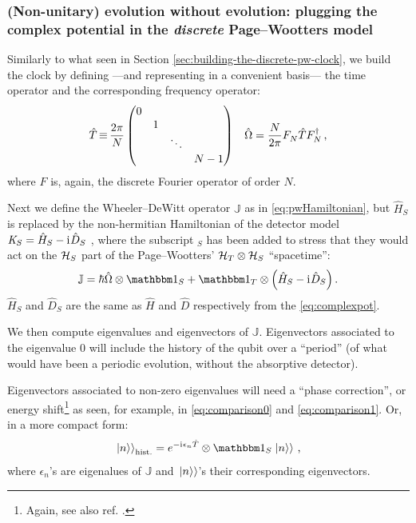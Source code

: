 \citereset
\subsubsection{
  (Non-unitary) evolution without evolution:
  plugging the complex potential in the \emph{discrete} Page--Wootters model
}

Similarly to what seen in Section \ref{sec:building-the-discrete-pw-clock}, we build
the clock by defining ---and representing in a convenient basis---
the time operator and the corresponding frequency operator:
\begin{align}
  \hat{T} \operatorname*{\equiv} \frac{2\pi}{N}
  \begin{pmatrix}
    0           &       &       &       \\
                &1      &       &       \\
                &       &\ddots &       \\
                &       &       &N-1
  \end{pmatrix}
  &&
  \hat{\Omega} = \frac{N}{2\pi} F^{}_{N} \hat{T} F^{\dagger}_{N} \, \text{,}
\end{align}
where $F$ is, again, the discrete Fourier operator of order $N$.

Next we define the Wheeler--DeWitt operator $\mathbb{J}$ as in
\eqref{eq:pwHamiltonian}, but $\hat{H}_S$ is replaced by the non-hermitian
Hamiltonian of the detector model
$\mathit{K}_S = \hat{H}_S - \mathrm{i}\mkern1mu \hat{D}_S$
\parencite{RuschhauptAbsorption},
where the subscript $_S$ has been added to stress
that they would act on the $\mathcal{H}_S$ part
of the Page--Wootters' $\mathcal{H}_T \otimes \mathcal{H}_S$ ``spacetime'':
\begin{equation}
  \mathbb{J} = \hbar\hat{\Omega}\ox\idop_S + \idop_T\ox\qty(\hat{H}_S -\iu \hat{D}_S) \,\text{.}
\end{equation}
$\hat{H}_S$ and $\hat{D}_S$ are the same as $\hat{H}$ and $\hat{D}$
respectively from the \eqref{eq:complexpot}.

We then compute eigenvalues and eigenvectors of $\mathbb{J}$.
Eigenvectors associated to the eigenvalue $0$ will include
the history of the qubit over a ``period''
(of what would have been a periodic evolution, without the absorptive detector).

Eigenvectors associated to non-zero eigenvalues will need a ``phase correction'',
or energy shift\footnote{ Again, see also ref. \cite[sec.``The Zero-eigenvalue'']{Lloyd:Time}. }
as seen, for example, in \eqref{eq:comparison0} and \eqref{eq:comparison1}.
Or, in a more compact form:
\begin{equation}
  \dket{n}_{\text{hist.}} = e^{-\iu \epsilon_n \hat{T}} \ox \idop_S \dket{n}
  \,\text{,}
\end{equation}
where $\epsilon_n$'s are eigenalues of $\mathbb{J}$ and
$\left.\left| n \right\rangle\right\rangle$'s their corresponding eigenvectors.

